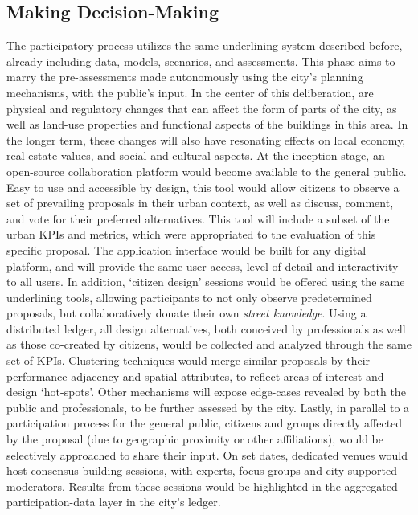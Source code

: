 {{      \subsection{Making Decision-Making}
      {
          The participatory process utilizes the same underlining system described before, already including data, models, scenarios, and assessments. This phase aims to marry the pre-assessments made autonomously using the city's planning mechanisms, with the public's input. In the center of this deliberation, are physical and regulatory changes that can affect the form of parts of the city, as well as land-use properties and functional aspects of the buildings in this area. In the longer term, these changes will also have resonating effects on local economy, real-estate values, and social and cultural aspects.
          \newline
          At the inception stage, an open-source collaboration platform would become available to the general public. Easy to use and accessible by design, this tool would allow citizens to observe a set of prevailing proposals in their urban context, as well as discuss, comment, and vote for their preferred alternatives. This tool will include  a subset of the urban KPIs and metrics, which were appropriated to the evaluation of this specific proposal. The application interface would be built for any digital platform, and will provide the same user access, level of detail and interactivity to all users.
          \newline
          In addition, `citizen design' sessions would be offered using the same underlining tools, allowing participants to not only observe predetermined proposals, but collaboratively donate their own \textit{street knowledge}. Using a distributed ledger, all design alternatives, both conceived by professionals as well as those co-created by citizens, would be collected and analyzed through the same set of KPIs. Clustering techniques would merge similar proposals by their performance adjacency and spatial attributes, to reflect areas of interest and design `hot-spots'. Other mechanisms will expose edge-cases revealed by both the public and professionals, to be further assessed by the city.
          \newline
          Lastly, in parallel to a participation process for the general public, citizens and groups directly affected by the proposal (due to geographic proximity or other affiliations), would be selectively approached to share their input. On set dates, dedicated venues would host consensus building sessions, with experts, focus groups and city-supported moderators. Results from these sessions would be highlighted in the aggregated participation-data layer in the city's ledger.
      }

}}
